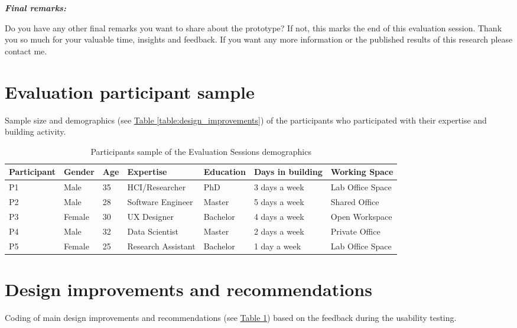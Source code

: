 \begin{appendices}
\textit{\textbf{Final remarks:}}

Do you have any other final remarks you want to share about the prototype?  If not, this marks the end of this evaluation session. Thank you so much for your valuable time, insights and feedback. If you want any more information or the published results of this research please contact me.\\

\newpage

\section{Evaluation participant sample}
\label{appendix:participants}

Sample size and demographics (see \hyperref[table:design_improvements]{Table \ref{table:design_improvements}}) of the participants who participated with their expertise and building activity.

\begin{table}[h!]
\centering
\begin{tabular}{| p{2cm} | p{1.5cm} | p{1cm} | p{3cm} | p{2cm} | p{3cm} | p{3cm} |}
\hline
\textbf{Participant} & \textbf{Gender} & \textbf{Age} & \textbf{Expertise} & \textbf{Education} & \textbf{Days in building} & \textbf{Working Space} \\ 
\hline
P1 & Male & 35 & HCI/Researcher & PhD & 3 days a week & Lab Office Space \\ 
\hline
P2 & Male & 28 & Software Engineer & Master & 5 days a week & Shared Office \\ 
\hline
P3 & Female & 30 & UX Designer & Bachelor & 4 days a week & Open Workspace \\ 
\hline
P4 & Male & 32 & Data Scientist & Master & 2 days a week & Private Office \\ 
\hline
P5 & Female & 25 & Research Assistant & Bachelor & 1 day a week & Lab Office Space \\ 
\hline
\end{tabular}
\caption{Participants sample of the Evaluation Sessions demographics}
\label{table:participants}
\end{table}


\section{Design improvements and recommendations}
\label{appendix:improvements}

Coding of main design improvements and recommendations (see \hyperref[table:participants]{Table \ref{table:participants}}) based on the feedback during the usability testing.



\end{appendices}
